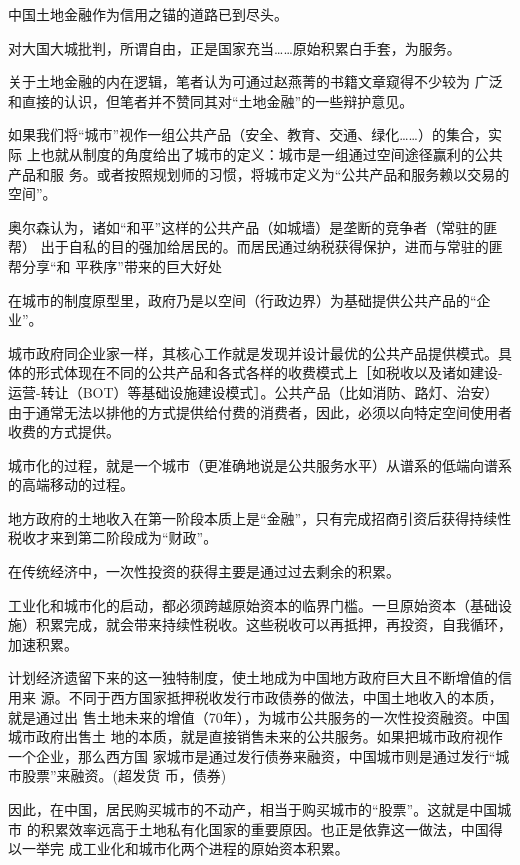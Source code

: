 中国土地金融作为信用之锚的道路已到尽头。




对大国大城批判，所谓自由，正是国家充当……原始积累白手套，为服务。



关于土地金融的内在逻辑，笔者认为可通过赵燕菁的书籍文章\cite{dajueqi}窥得不少较为
广泛和直接的认识，但笔者并不赞同其对“土地金融”的一些辩护意见。




如果我们将“城市”视作一组公共产品（安全、教育、交通、绿化……）的集合，实际
上也就从制度的角度给出了城市的定义：城市是一组通过空间途径赢利的公共产品和服
务。或者按照规划师的习惯，将城市定义为“公共产品和服务赖以交易的空间”。

奥尔森认为，诸如“和平”这样的公共产品（如城墙）是垄断的竞争者（常驻的匪帮）
出于自私的目的强加给居民的。而居民通过纳税获得保护，进而与常驻的匪帮分享“和
平秩序”带来的巨大好处

在城市的制度原型里，政府乃是以空间（行政边界）为基础提供公共产品的“企业”。

城市政府同企业家一样，其核心工作就是发现并设计最优的公共产品提供模式。具体的形式体现在不同的公共产品和各式各样的收费模式上［如税收以及诸如建设-运营-转让（BOT）等基础设施建设模式］。公共产品（比如消防、路灯、治安）由于通常无法以排他的方式提供给付费的消费者，因此，必须以向特定空间使用者收费的方式提供。

城市化的过程，就是一个城市（更准确地说是公共服务水平）从谱系的低端向谱系的高端移动的过程。

地方政府的土地收入在第一阶段本质上是“金融”，只有完成招商引资后获得持续性税收才来到第二阶段成为“财政”。

在传统经济中，一次性投资的获得主要是通过过去剩余的积累。

工业化和城市化的启动，都必须跨越原始资本的临界门槛。一旦原始资本（基础设施）积累完成，就会带来持续性税收。这些税收可以再抵押，再投资，自我循环，加速积累。

计划经济遗留下来的这一独特制度，使土地成为中国地方政府巨大且不断增值的信用来
源。不同于西方国家抵押税收发行市政债券的做法，中国土地收入的本质，就是通过出
售土地未来的增值（70年），为城市公共服务的一次性投资融资。中国城市政府出售土
地的本质，就是直接销售未来的公共服务。如果把城市政府视作一个企业，那么西方国
家城市是通过发行债券来融资，中国城市则是通过发行“城市股票”来融资。(超发货
币，债券)

因此，在中国，居民购买城市的不动产，相当于购买城市的“股票”。这就是中国城市
的积累效率远高于土地私有化国家的重要原因。也正是依靠这一做法，中国得以一举完
成工业化和城市化两个进程的原始资本积累。

